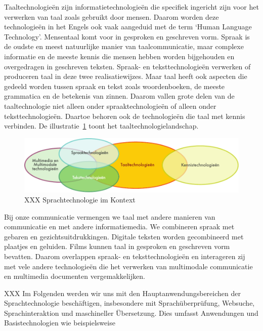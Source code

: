 \documentclass[]{../../metanetpaper}
\begin{document}
\begin{multicols}{2}
    Taaltechnologie{\"e}n zijn informatietechnologie{\"e}n die specifiek ingericht zijn voor het verwerken van taal zoals gebruikt door mensen. Daarom worden deze technologie{\"e}n in het Engels ook vaak aangeduid met de term `Human Language Technology'. Mensentaal komt voor in gesproken en geschreven vorm. Spraak is de oudste en meest natuurlijke manier van taalcommunicatie, maar complexe informatie en de meeste kennis die mensen hebben worden bijgehouden en overgedragen in geschreven teksten. Spraak- en teksttechnologie{\"e}n verwerken of produceren taal in deze twee realisatiewijzes. Maar taal heeft ook aspecten die gedeeld worden tussen spraak en tekst zoals woordenboeken, de meeste grammatica en de betekenis van zinnen. Daarom vallen grote delen van de taaltechnologie niet alleen onder spraaktechnologie{\"e}n of alleen onder teksttechnologie{\"e}n. Daartoe behoren ook de technologie{\"e}n die taal met kennis verbinden. De illustratie~\ref{fig:ltincontext_nl} toont het taaltechnologielandschap. 


\begin{figure}[htb]
  \center
  \includegraphics[width=\textwidth]{../_media/dutch/language_technologies}
  \caption{XXX Sprachtechnologie im Kontext}
  \label{fig:ltincontext_nl}
\end{figure}


Bij onze communicatie vermengen we taal met andere manieren van communicatie en met andere informatiemedia. We combineren spraak met gebaren en gezichtsuitdrukkingen. Digitale teksten worden gecombineerd met plaatjes en geluiden. Films kunnen taal in gesproken en geschreven vorm bevatten. Daarom overlappen spraak- en teksttechnologie{\"e}n en interageren zij met vele andere technologie{\"e}n die het verwerken van multimodale communicatie en multimedia documenten vergemakkelijken.

XXX
Im Folgenden werden wir uns mit den Hauptanwendungsbereichen der Sprachtechnologie beschäftigen, insbesondere mit Sprachüberprüfung, Websuche, Sprach\-inter\-aktion und maschineller Übersetzung. Dies umfasst Anwendungen und Basistechnologien wie beispielsweise


\end{multicols}
\end{document}
